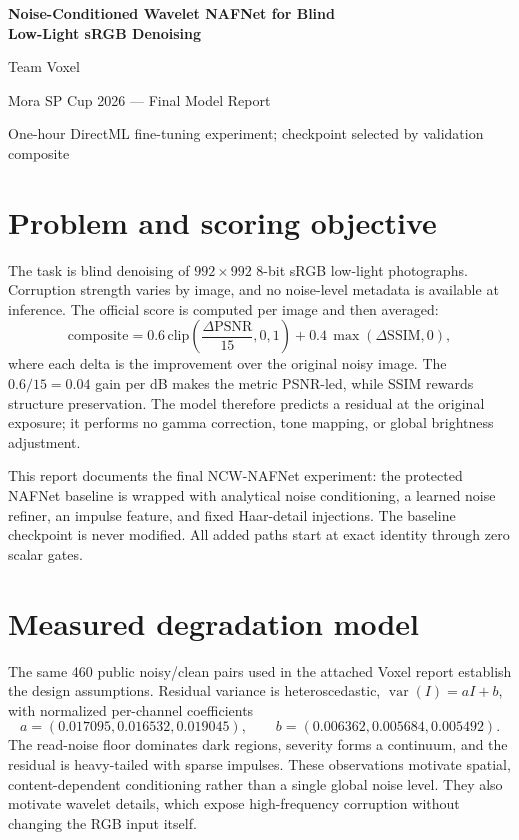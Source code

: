 \documentclass[12pt,a4paper]{article}
\begin{document}
\begin{center}
{\LARGE\bfseries Noise-Conditioned Wavelet NAFNet for Blind\\[3pt] Low-Light sRGB Denoising\par}
\vspace{0.55em}
{\large Team Voxel}\par
\vspace{0.35em}
{\normalsize Mora SP Cup 2026 --- Final Model Report}\par
{\small One-hour DirectML fine-tuning experiment; checkpoint selected by validation composite}
\end{center}

\section{Problem and scoring objective}
The task is blind denoising of $992\times992$ 8-bit sRGB low-light photographs. Corruption strength varies by image, and no noise-level metadata is available at inference. The official score is computed per image and then averaged:
\begin{equation}
\mathrm{composite}=0.6\,\mathrm{clip}\!\left(\frac{\Delta\mathrm{PSNR}}{15},0,1\right)
+0.4\,\max(\Delta\mathrm{SSIM},0),
\end{equation}
where each delta is the improvement over the original noisy image. The $0.6/15=0.04$ gain per dB makes the metric PSNR-led, while SSIM rewards structure preservation. The model therefore predicts a residual at the original exposure; it performs no gamma correction, tone mapping, or global brightness adjustment.

This report documents the final NCW-NAFNet experiment: the protected NAFNet baseline is wrapped with analytical noise conditioning, a learned noise refiner, an impulse feature, and fixed Haar-detail injections. The baseline checkpoint is never modified. All added paths start at exact identity through zero scalar gates.

\section{Measured degradation model}
The same 460 public noisy/clean pairs used in the attached Voxel report establish the design assumptions. Residual variance is heteroscedastic, $\operatorname{var}(I)=aI+b$, with normalized per-channel coefficients
\[
a=(0.017095,0.016532,0.019045),\qquad
b=(0.006362,0.005684,0.005492).
\]
The read-noise floor dominates dark regions, severity forms a continuum, and the residual is heavy-tailed with sparse impulses. These observations motivate spatial, content-dependent conditioning rather than a single global noise level. They also motivate wavelet details, which expose high-frequency corruption without changing the RGB input itself.
\end{document}

